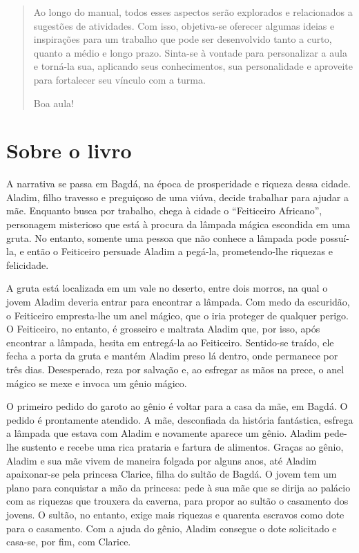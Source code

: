 \documentclass[11pt]{extarticle}
\begin{document}
\begin{abstract}

Ao longo do manual, todos esses aspectos serão explorados e relacionados a sugestões de atividades. Com isso, objetiva-se oferecer algumas ideias e inspirações para um trabalho que pode ser desenvolvido tanto a curto, quanto a médio e longo prazo. Sinta-se à vontade para personalizar a aula e torná-la sua, aplicando seus conhecimentos, sua 
personalidade e aproveite para fortalecer seu vínculo com a turma.

Boa aula!

\end{abstract}

\section{Sobre o livro}
A narrativa se passa em Bagdá, na época de prosperidade e riqueza dessa cidade.
Aladim, filho travesso e preguiçoso de uma viúva, decide trabalhar para ajudar a mãe.
Enquanto busca por trabalho, chega à cidade o “Feiticeiro Africano”, personagem misterioso que está à procura da lâmpada mágica escondida em uma gruta. No entanto, somente uma pessoa que não conhece a lâmpada pode possuí-la, e então o Feiticeiro persuade Aladim a pegá-la, prometendo-lhe riquezas e felicidade.

A gruta está localizada em um vale no deserto, entre dois morros, na qual o jovem Aladim deveria entrar para encontrar a lâmpada. Com medo da escuridão, o Feiticeiro empresta-lhe um anel mágico, que o iria proteger de qualquer perigo. O Feiticeiro, no entanto, é grosseiro e maltrata Aladim que, por isso, após encontrar a lâmpada, hesita em entregá-la ao Feiticeiro. Sentido-se traído, ele fecha a porta da gruta e mantém Aladim preso lá dentro, onde permanece por três dias. Desesperado, reza por salvação e, ao esfregar as mãos na prece, o anel mágico se mexe e invoca um gênio mágico.

O primeiro pedido do garoto ao gênio é voltar para a casa da mãe, em Bagdá. O pedido é prontamente atendido. A mãe, desconfiada da história fantástica, esfrega a lâmpada que estava com Aladim e novamente aparece um gênio. Aladim pede-lhe sustento e recebe uma rica prataria e fartura de alimentos. Graças ao gênio, Aladim e sua mãe vivem de maneira folgada por alguns anos, até Aladim apaixonar-se pela princesa Clarice, filha do sultão de Bagdá. O jovem tem um plano para conquistar a mão da princesa: pede à sua mãe que se dirija ao palácio com as riquezas que trouxera da caverna, para propor ao sultão o casamento dos jovens. O sultão, no entanto, exige mais riquezas e quarenta escravos como dote para o casamento. Com a ajuda do gênio, Aladim consegue o dote solicitado e casa-se, por fim, com Clarice.
\end{document}
